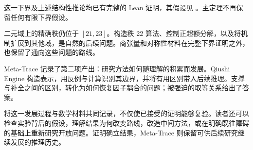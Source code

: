这一下界及上述结构性推论均已有完整的 Lean 证明，其假设见 。主定理不再保留任何有限下界假设。

二元域上的精确秩仍位于 $[21,23]$。构造秩 22 算法、控制正超额分解，以及将机制扩展到其他域，是自然的后续问题。商张量和对称性材料在完整下界证明之外，也保留了通向这些问题的路线。

Meta-Trace 记录了第二项产出：研究方法如何随理解的积累而发展。Qiushi Engine 构造表示，用反例与计算识别其边界，并将有用区别带入后续推理。支撑与补全之间的区别，转化为如何恢复因子耦合的问题；被强迫的取等关系给出了答案。

将这一发展过程与数学材料共同记录，不仅使已接受的证明能够复验。读者还可以检查实验背后的假设，理解结果为何改变路线，改造中间方法，或在明确既往障碍的基础上重新研究开放问题。证明确立结果，Meta-Trace 则保留可供后续研究继续发展的推理历史。
